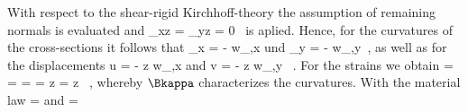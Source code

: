 With respect to the shear-rigid {\sc Kirchhoff}-theory the 
assumption of remaining normals is evaluated and 
\eb
\gamma_{xz} = \gamma_{yz} = 0 \, 
\ee
is aplied. Hence, for the curvatures of the cross-sections 
it follows that 
\eb
\beta_x = - w_{,x} \qquad \mbox{und} \qquad \beta_y = - w_{,y}\, ,
\ee
as well as for the displacements
\eb
u = - z w_{,x} \qquad \mbox{and} \qquad v = - z w_{,y} \, .
\ee
For the strains we obtain
\eb
\Bvarepsilon =  = \left[ \begin{array}{c} u_{,x} \\
v_{,y} \\ u_{,y} + v_{,x} \end{array} \right] =
\left[ \begin{array}{c} - z w_{,xx} \\ -z w_{,yy} \\ -z (w_{,xy} +
w_{,yx}) \end{array} \right] =
z \left[ \begin{array}{c} - w_{,xx} \\ - w_{,yy} \\ - 2 w_{,xy}
\end{array} \right] = z \Bkappa \, ,
\label{eq:nKinStr}
\ee
whereby $\Bkappa$ characterizes the curvatures. With the material law
\eb
{} =  
 \quad \mbox{and} \; \Bsigma = {\bf \IC} \,
